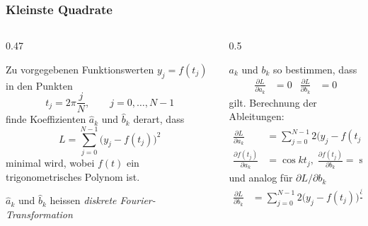 %
%
\begin{frame}
\frametitle{Kleinste Quadrate}
\begin{columns}
\begin{column}{0.47\hsize}
\begin{leastsquares}
Zu vorgegebenen Funktionswerten $y_j=f(t_j)$ in den Punkten
\[
t_j = 2\pi \frac{j}{N},\qquad j=0,\dots,N-1
\]
finde Koeffizienten $\hat a_k$ und $\hat b_k$ derart, dass
\[
L=\sum_{j=0}^{N-1} \bigl(y_j - f(t_j)\bigr)^2
\]
minimal wird, wobei $f(t)$ ein trigonometrisches Polynom ist.
\end{leastsquares}
$\hat{a}_k$ und $\hat{b}_k$ heissen {\em diskrete Fourier-Transformation}
\end{column}
\begin{column}{0.5\hsize}
\begin{loesung}
$a_k$ und $b_k$ so bestimmen, dass
\begin{align*}
\frac{\partial L}{\partial a_k}&=0&
\frac{\partial L}{\partial b_k}&=0
\end{align*}
gilt.
Berechnung der Ableitungen:
\begin{align*}
\frac{\partial L}{\partial a_k}
&=
\sum_{j=0}^{N-1}2\bigl(y_j-f(t_j)\bigr)
\frac{\partial f(t_j)}{\partial a_k}
\\
\frac{\partial f(t_j)}{\partial a_k}
&=
\cos kt_j
,\;
\frac{\partial f(t_j)}{\partial b_k}
=
\sin kt_j
\end{align*}
und analog für $\partial L/\partial b_k$
\begin{align*}
\frac{\partial L}{\partial b_k}
&=
\sum_{j=0}^{N-1}2\bigl(y_j-f(t_j)\bigr)
\frac{\partial f(t_j)}{\partial b_k}
\end{align*}
\end{loesung}
\end{column}
\end{columns}
\end{frame}

